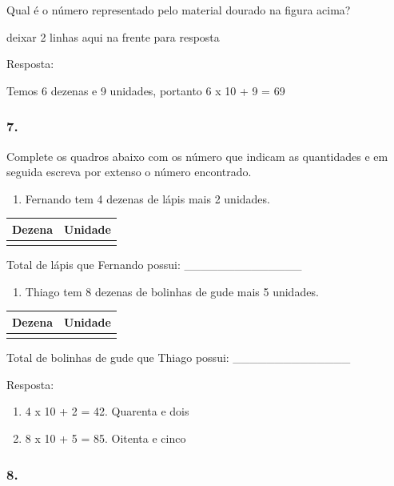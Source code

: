 Qual é o número representado pelo material dourado na figura acima?

deixar 2 linhas aqui na frente para resposta

Resposta:

Temos 6 dezenas e 9 unidades, portanto 6 x 10 + 9 = 69

\subsubsection{7.}\label{section-6}

Complete os quadros abaixo com os número que indicam as quantidades e em
seguida escreva por extenso o número encontrado.

\begin{enumerate}
\def\labelenumi{\alph{enumi})}
\item
  Fernando tem 4 dezenas de lápis mais 2 unidades.
\end{enumerate}

\begin{longtable}[]{@{}ll@{}}
\toprule
Dezena & Unidade\tabularnewline
\midrule
\endhead
&\tabularnewline
\bottomrule
\end{longtable}

Total de lápis que Fernando possui: \_\_\_\_\_\_\_\_\_\_\_\_\_\_

\begin{enumerate}
\def\labelenumi{\alph{enumi})}
\item
  Thiago tem 8 dezenas de bolinhas de gude mais 5 unidades.
\end{enumerate}

\begin{longtable}[]{@{}ll@{}}
\toprule
Dezena & Unidade\tabularnewline
\midrule
\endhead
&\tabularnewline
\bottomrule
\end{longtable}

Total de bolinhas de gude que Thiago possui:
\_\_\_\_\_\_\_\_\_\_\_\_\_\_

Resposta:

\begin{enumerate}
\def\labelenumi{\alph{enumi})}
\item
  4 x 10 + 2 = 42. Quarenta e dois
\item
  8 x 10 + 5 = 85. Oitenta e cinco
\end{enumerate}

\subsubsection{8.}\label{section-7}

